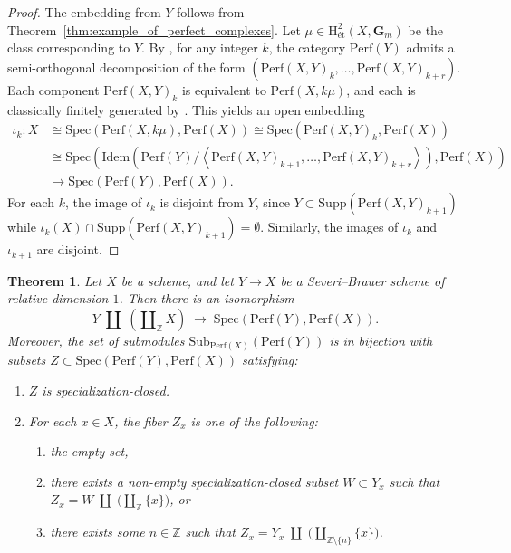 \documentclass[11pt]{amsart}
\theoremstyle{definition}
\theoremstyle{plain}
\newtheorem{thm}[defn]{Theorem}
\theoremstyle{remark}
\newcommand{\perf}{\mathrm{Perf}}
\newcommand{\Idem}{\mathrm{Idem}}
\newcommand{\Spec}{\mathrm{Spec}}
\newcommand{\Sub}{\mathrm{Sub}}
\newcommand{\Supp}{\mathrm{Supp}}
\newcommand{\ang}[1]{{\left\langle{#1}\right\rangle}}
\newcommand{\etch}{\mathrm{H}_{\text{\'{e}t}}}
\numberwithin{equation}{section}
\begin{document}
\begin{proof}
The embedding from \(Y\) follows from Theorem~\ref{thm:example_of_perfect_complexes}.
Let \(\mu \in \etch^2(X, \mathbf{G}_m)\) be the class corresponding to \(Y\).
By \cite{Be}, for any integer \(k\), the category \(\perf(Y)\) admits a semi-orthogonal decomposition of the form
\((\perf(X, Y)_k, \ldots, \perf(X, Y)_{k+r})\).
Each component \(\perf(X, Y)_k\) is equivalent to \(\perf(X, k\mu)\), and each is classically finitely generated by \cite{To2}.
This yields an open embedding
\begin{align*}
\iota_k : X &\cong \Spec(\perf(X, k\mu), \perf(X))\cong \Spec(\perf(X,Y)_k,\perf(X)) \\
&\cong \Spec\!\left(\Idem\!\left(\perf(Y) / \ang{\perf(X, Y)_{k+1}, \ldots, \perf(X, Y)_{k+r}}\right), \perf(X)\right)\\
&\to \Spec(\perf(Y), \perf(X)).
\end{align*}
For each \(k\), the image of \(\iota_k\) is disjoint from \(Y\), since \(Y\subset \Supp(\perf(X,Y)_{k+1})\) while \(\iota_k(X)\cap \Supp(\perf(X,Y)_{k+1})=\emptyset\). 
Similarly, the images of \(\iota_k\) and \(\iota_{k+1}\) are disjoint.
\end{proof}

\begin{thm}
Let \(X\) be a scheme, and let \(Y\to X\) be a Severi--Brauer scheme of relative dimension \(1\).
Then there is an isomorphism
\[
Y\;\amalg\; \left(\amalg_\mathbb{Z} X\right)\;\longrightarrow\; \Spec(\perf(Y),\perf(X)).
\]
Moreover, the set of submodules \(\Sub_{\perf(X)}(\perf(Y))\) is in bijection with subsets \(Z\subset \Spec(\perf(Y),\perf(X))\) satisfying:
\begin{enumerate}
\item \(Z\) is specialization-closed.
\item For each \(x\in X\), the fiber \(Z_x\) is one of the following:
\begin{enumerate}
\item the empty set,
\item there exists a non-empty specialization-closed subset \(W\subset Y_x\) such that \(Z_x=W\;\amalg\;\bigl(\amalg_{\mathbb{Z}}\{x\}\bigr)\), or
\item there exists some \(n\in\mathbb{Z}\) such that \(Z_x=Y_x\;\amalg\;\bigl(\amalg_{\mathbb{Z}\setminus\{n\}}\{x\}\bigr)\).
\end{enumerate}
\end{enumerate}
\end{thm}
\end{document}
